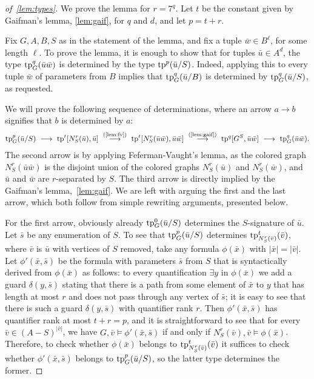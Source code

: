 \begin{proof}[of~\cref{lem:types}]
We prove the lemma for $r=7^q$.
Let $t$ be the constant given by Gaifman's lemma, \cref{lem:gaif}, for $q$ and $d$, and let $p=t+r$.

Fix $G,A,B,S$ as in the statement of the lemma, and fix a tuple $\bar w\in B^\ell$, for some length $\ell$.
To prove the lemma, it is enough to show that
for tuples $\bar u\in A^d$,
the type $\mathrm{tp}^q_G(\bar u\bar w)$ is determined by the type $\mathrm{tp}^p(\bar u/S)$.
Indeed, applying this to every tuple $\bar w$ of parameters from $B$ implies that $\mathrm{tp}^q_G(\bar u/B)$ is determined by $\mathrm{tp}^q_G(\bar u/S)$, as requested.

We will prove the following sequence of determinations,
where an arrow $a\rightarrow b$ signifies that $b$ is determined by $a$:
\begin{align*}
	\tp^p_G(\bar u/S)
  \ \longrightarrow\ 
	\tp^{t}[N^r_S(\bar u), \bar u]
  \ \stackrel{\textrm{(\ref{lem:fv})}}{\longrightarrow}\ 
	\tp^{t}[N^r_S(\bar u\bar w), \bar u\bar w] \ \stackrel{\textrm{(\ref{lem:gaif})}}\longrightarrow\ 
	\tp^q[G^S, \bar u\bar w] \ \longrightarrow\ 
	\tp^q_G(\bar u\bar w).
\end{align*}
The second arrow is by applying Feferman-Vaught's lemma,
as the colored graph $N^r_S(\bar u\bar w)$
is the disjoint union of the colored graphs 
$N^r_S(\bar u)$ and $N^r_S(\bar w)$,
and $\bar u$ and $\bar w$ are $r$-separated by $S$.
The third arrow is directly implied by the Gaifman's lemma,~\cref{lem:gaif}.
We are left with arguing the first and the last arrow, which both follow from simple rewriting arguments, presented below.

\medskip
For the first arrow, obviously already $\mathrm{tp}^0_G(\bar u/S)$ determines the $S$-signature of $\bar u$. Let $\bar s$ be any enumeration of $S$.
To see that $\mathrm{tp}^p_G(\bar u/S)$ determines $\mathrm{tp}^{t}_{N^r_S(\bar v)}(\bar v)$, where $\bar v$ is $\bar u$ with vertices of $S$ removed, take any formula $\phi(\bar x)$ with $|\bar x|=|\bar v|$.
Let $\phi'(\bar x,\bar s)$ be the formula with parameters $\bar s$ from $S$ that is syntactically derived from $\phi(\bar x)$ as follows: 
to every quantification $\exists y$ in $\phi(\bar x)$ we add a guard $\delta(y,\bar s)$ stating that there is a path from some element of $\bar x$ to $y$ that has length at most $r$ and does not pass through
any vertex of $\bar s$; it is easy to see that there is such a guard $\delta(y,\bar s)$ with quantifier rank $r$.
Then $\phi'(\bar x,\bar s)$ has quantifier rank at most $t+r=p$, and it is straightforward to see that for every $\bar v\in (A-S)^{|\bar v|}$, we have $G,\bar v\models \phi'(\bar x,\bar s)$ if and only if
$N^r_S(\bar v),\bar v\models \phi(\bar x)$. Therefore, to check whether $\phi(\bar x)$ belongs to $\mathrm{tp}^{t}_{N^r_S(\bar v)}(\bar v)$ it suffices to check 
whether $\phi'(\bar x,\bar s)$ belongs to $\mathrm{tp}^p_G(\bar u/S)$, so the latter type determines the former.


\end{proof}

